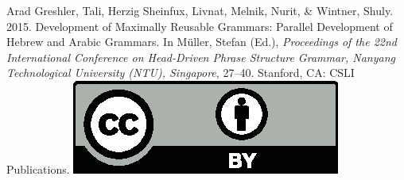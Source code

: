 \documentclass[a4paper,11pt]{article}
\begin{document}
\noindent



\vfill
\noindent
Arad Greshler, Tali, Herzig Sheinfux, Livnat, Melnik, Nurit, \& Wintner, Shuly. 2015. Development of Maximally Reusable Grammars: Parallel Development of Hebrew and Arabic Grammars. In Müller, Stefan (Ed.), \emph{{Proceedings of the 22nd International Conference on Head-Driven Phrase Structure Grammar, Nanyang Technological University (NTU), Singapore}}, 27--40. Stanford,
CA: CSLI Publications. \hfill\href{http://creativecommons.org/licenses/by/4.0/}{\includegraphics[height=.75em]{Includes/ccby.eps}}

\newpage

        
\end{document}
